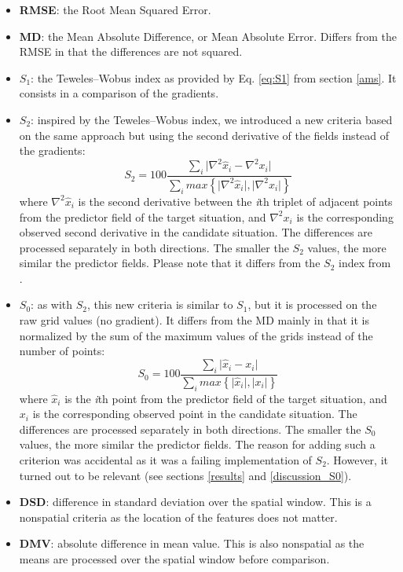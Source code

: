 \documentclass[draft]{agujournal2019}
\begin{document}
\begin{itemize}
	\item \textbf{RMSE}: the Root Mean Squared Error.
	\item \textbf{MD}: the Mean Absolute Difference, or Mean Absolute Error. Differs from the RMSE in that the differences are not squared.
	\item \textbf{$S_{1}$}: the Teweles--Wobus index as provided by Eq. \ref{eq:S1} from section \ref{ams}. It consists in a comparison of the gradients. 
	\item \textbf{$S_{2}$}: inspired by the Teweles--Wobus index, we introduced a new criteria based on the same approach but using the second derivative of the fields instead of the gradients:
	\begin{equation}
		\label{eq:S2}
		S_{2}=100 \frac {\displaystyle \sum_{i} \vert \nabla^{2}\hat{x}_{i} - \nabla^{2} x_{i} \vert}
		{\displaystyle \sum_{i} max\left\lbrace \vert \nabla^{2}\hat{x}_{i} \vert , \vert \nabla^{2} x_{i} \vert \right\rbrace }
	\end{equation}
	where $\nabla^{2} \hat{x}_{i}$ is the second derivative between the \textit{i}th triplet of adjacent points from the predictor field of the target situation, and $\nabla^{2} x_{i}$ is the corresponding observed second derivative in the candidate situation. The differences are processed separately in both directions. The smaller the $S_{2}$ values, the more similar the predictor fields. Please note that it differs from the $S_{2}$ index from .
	\item \textbf{$S_{0}$}: as with $S_{2}$, this new criteria is similar to $S_{1}$, but it is processed on the raw grid values (no gradient). It differs from the MD mainly in that it is normalized by the sum of the maximum values of the grids instead of the number of points:
	\begin{equation}
		\label{eq:S0}
		S_{0}=100 \frac {\displaystyle \sum_{i} \vert \hat{x}_{i} - x_{i} \vert}
		{\displaystyle \sum_{i} max\left\lbrace \vert \hat{x}_{i} \vert , \vert x_{i} \vert \right\rbrace }
	\end{equation}
	where $\hat{x}_{i}$ is the \textit{i}th point from the predictor field of the target situation, and $x_{i}$ is the corresponding observed point in the candidate situation. The differences are processed separately in both directions. The smaller the $S_{0}$ values, the more similar the predictor fields. The reason for adding such a criterion was accidental as it was a failing implementation of $S_{2}$. However, it turned out to be relevant (see sections \ref{results} and \ref{discussion_S0}).
	\item \textbf{DSD}: difference in standard deviation over the spatial window. This is a nonspatial criteria as the location of the features does not matter.
	\item \textbf{DMV}: absolute difference in mean value. This is also nonspatial as the means are processed over the spatial window before comparison.
\end{itemize}
\end{document}
